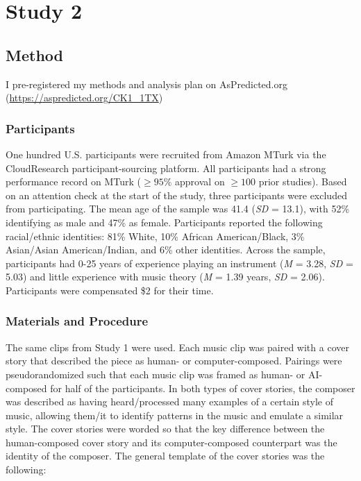 \documentclass[12pt,twoside]{reedthesis}
\begin{document}
\chapter*{Study 2}

\section{Method}

I pre-registered my methods and analysis plan on AsPredicted.org (\url{https://aspredicted.org/CK1_1TX})

\subsection*{Participants}

One hundred U.S. participants were recruited from Amazon MTurk via the CloudResearch participant-sourcing platform. All participants had a strong performance record on MTurk ($\ge95\%$ approval on $\ge100$ prior studies). Based on an attention check at the start of the study, three participants were excluded from participating. The mean age of the sample was 41.4 (\emph{SD} = 13.1), with 52\% identifying as male and 47\% as female. Participants reported the following racial/ethnic identities: 81\% White, 10\% African American/Black, 3\% Asian/Asian American/Indian, and 6\% other identities. Across the sample, participants had 0-25 years of experience playing an instrument (\emph{M} = 3.28, \emph{SD} = 5.03) and little experience with music theory (\emph{M} = 1.39 years, \emph{SD} = 2.06). Participants were compensated \$2 for their time. 

\subsection{Materials and Procedure}

The same clips from Study 1 were used. Each music clip was paired with a cover story that described the piece as human- or computer-composed. Pairings were pseudorandomized such that each music clip was framed as human- or AI-composed for half of the participants. In both types of cover stories, the composer was described as having heard/processed many examples of a certain style of music, allowing them/it to identify patterns in the music and emulate a similar style. The cover stories were worded so that the key difference between the human-composed cover story and its computer-composed counterpart was the identity of the composer. The general template of the cover stories was the following:
\\
\end{document}
